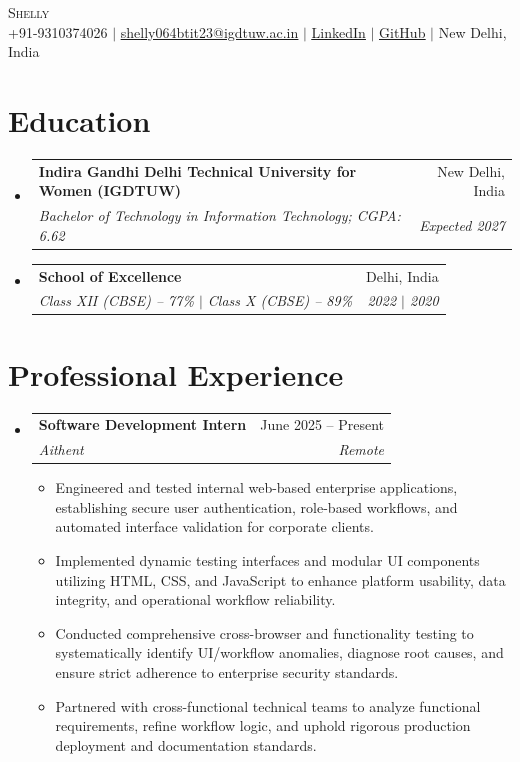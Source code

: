 \documentclass[letterpaper,10pt]{article}
\makeatletter
\newcommand{\resumeItem}[1]{
  \item\small{
    {#1 \vspace{-2pt}}
  }
}
\newcommand{\resumeSubheading}[4]{
  \vspace{-2pt}\item
    \begin{tabular*}{0.97\textwidth}[t]{l@{\extracolsep{\fill}}r}
      \textbf{#1} & #2 \\
      \textit{\small#3} & \textit{\small #4} \\
    \end{tabular*}\vspace{-5pt}
}
\newcommand{\resumeSubHeadingListStart}{\begin{itemize}[leftmargin=0.15in, label={}]}
\newcommand{\resumeSubHeadingListEnd}{\end{itemize}}
\newcommand{\resumeItemListStart}{\begin{itemize}[leftmargin=0.15in, label=$\bullet$]}
\newcommand{\resumeItemListEnd}{\end{itemize}\vspace{-4pt}}
\makeatother
\begin{document}
\begin{center}
    {\Huge \scshape Shelly} \\ \vspace{2pt}
    \small +91-9310374026 $|$ 
    \href{mailto:shelly064btit23@igdtuw.ac.in}{\underline{shelly064btit23@igdtuw.ac.in}} $|$ 
    \href{https://linkedin.com}{\underline{LinkedIn}} $|$ 
    \href{https://github.com}{\underline{GitHub}} $|$
    New Delhi, India
\end{center}

\section{Education}
  \resumeSubHeadingListStart
    \resumeSubheading
      {Indira Gandhi Delhi Technical University for Women (IGDTUW)}{New Delhi, India}
      {Bachelor of Technology in Information Technology; CGPA: 6.62}{Expected 2027}
    \resumeSubheading
      {School of Excellence}{Delhi, India}
      {Class XII (CBSE) -- 77\% \quad $|$ \quad Class X (CBSE) -- 89\%}{2022 $|$ 2020}
  \resumeSubHeadingListEnd

\section{Professional Experience}
  \resumeSubHeadingListStart
    \resumeSubheading
      {Software Development Intern}{June 2025 -- Present}
      {Aithent}{Remote}
      \resumeItemListStart
        \resumeItem{Engineered and tested internal web-based enterprise applications, establishing secure user authentication, role-based workflows, and automated interface validation for corporate clients.}
        \resumeItem{Implemented dynamic testing interfaces and modular UI components utilizing HTML, CSS, and JavaScript to enhance platform usability, data integrity, and operational workflow reliability.}
        \resumeItem{Conducted comprehensive cross-browser and functionality testing to systematically identify UI/workflow anomalies, diagnose root causes, and ensure strict adherence to enterprise security standards.}
        \resumeItem{Partnered with cross-functional technical teams to analyze functional requirements, refine workflow logic, and uphold rigorous production deployment and documentation standards.}
      \resumeItemListEnd
  \resumeSubHeadingListEnd

\end{document}
